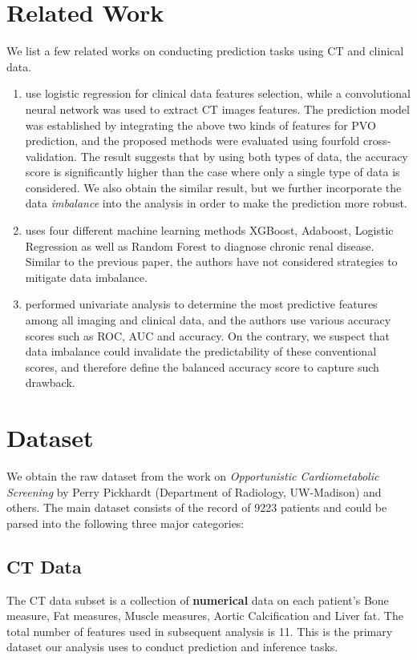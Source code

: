 \documentclass{article}
\begin{document}
\section{Related Work}

We list a few related works on conducting prediction tasks using CT and clinical data.

\begin{enumerate}
    \item \cite{yao2021machine} use logistic regression for clinical data features selection, while a convolutional
neural network was used to extract CT images features. The prediction model was established by integrating the above two
kinds of features for PVO prediction, and the proposed methods were evaluated using fourfold cross-validation. The result suggests that by using both types of data, the accuracy score is significantly higher than the case where only a single type of data is considered. We also obtain the similar result, but we further incorporate the data \textit{imbalance} into the analysis in order to make the prediction more robust. 
    \item \cite{raihan2021chronic}  uses four different machine learning methods XGBoost, Adaboost, Logistic Regression as well as Random Forest to diagnose chronic renal disease. Similar to the previous paper, the authors have not considered strategies to mitigate data imbalance. 
    \item \cite{shiri2021machine} performed univariate analysis to determine the most predictive
features among all imaging and clinical data, and the authors use various accuracy scores such as ROC, AUC and accuracy. On the contrary, we suspect that data imbalance could invalidate the predictability of these conventional scores, and therefore define the balanced accuracy score to capture such drawback.
\end{enumerate}

\section{Dataset}
We obtain the raw dataset from the work on \textit{Opportunistic Cardiometabolic Screening} by Perry Pickhardt (Department of Radiology, UW-Madison) and others. The main dataset consists of the record of 9223 patients and could be parsed into the following three major categories:

\subsection{CT Data}
The CT data subset is a collection of \textbf{numerical} data on each patient's Bone measure, Fat measures, Muscle measures, Aortic Calcification and Liver fat. The total number of features used in subsequent analysis is 11. This is the primary dataset our analysis uses to conduct prediction and inference tasks.
\end{document}
